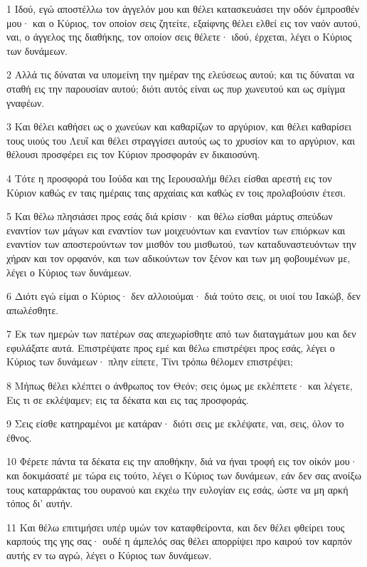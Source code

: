 \par 1 Ιδού, εγώ αποστέλλω τον άγγελόν μου και θέλει κατασκευάσει την οδόν έμπροσθέν μου· και ο Κύριος, τον οποίον σεις ζητείτε, εξαίφνης θέλει ελθεί εις τον ναόν αυτού, ναι, ο άγγελος της διαθήκης, τον οποίον σεις θέλετε· ιδού, έρχεται, λέγει ο Κύριος των δυνάμεων.
\par 2 Αλλά τις δύναται να υπομείνη την ημέραν της ελεύσεως αυτού; και τις δύναται να σταθή εις την παρουσίαν αυτού; διότι αυτός είναι ως πυρ χωνευτού και ως σμίγμα γναφέων.
\par 3 Και θέλει καθήσει ως ο χωνεύων και καθαρίζων το αργύριον, και θέλει καθαρίσει τους υιούς του Λευΐ και θέλει στραγγίσει αυτούς ως το χρυσίον και το αργύριον, και θέλουσι προσφέρει εις τον Κύριον προσφοράν εν δικαιοσύνη.
\par 4 Τότε η προσφορά του Ιούδα και της Ιερουσαλήμ θέλει είσθαι αρεστή εις τον Κύριον καθώς εν ταις ημέραις ταις αρχαίαις και καθώς εν τοις προλαβούσιν έτεσι.
\par 5 Και θέλω πλησιάσει προς εσάς διά κρίσιν· και θέλω είσθαι μάρτυς σπεύδων εναντίον των μάγων και εναντίον των μοιχευόντων και εναντίον των επιόρκων και εναντίον των αποστερούντων τον μισθόν του μισθωτού, των καταδυναστευόντων την χήραν και τον ορφανόν, και των αδικούντων τον ξένον και των μη φοβουμένων με, λέγει ο Κύριος των δυνάμεων.
\par 6 Διότι εγώ είμαι ο Κύριος· δεν αλλοιούμαι· διά τούτο σεις, οι υιοί του Ιακώβ, δεν απωλέσθητε.
\par 7 Εκ των ημερών των πατέρων σας απεχωρίσθητε από των διαταγμάτων μου και δεν εφυλάξατε αυτά. Επιστρέψατε προς εμέ και θέλω επιστρέψει προς εσάς, λέγει ο Κύριος των δυνάμεων· πλην είπετε, Τίνι τρόπω θέλομεν επιστρέψει;
\par 8 Μήπως θέλει κλέπτει ο άνθρωπος τον Θεόν; σεις όμως με εκλέπτετε· και λέγετε, Εις τι σε εκλέψαμεν; εις τα δέκατα και εις τας προσφοράς.
\par 9 Σεις είσθε κατηραμένοι με κατάραν· διότι σεις με εκλέψατε, ναι, σεις, όλον το έθνος.
\par 10 Φέρετε πάντα τα δέκατα εις την αποθήκην, διά να ήναι τροφή εις τον οίκόν μου· και δοκιμάσατέ με τώρα εις τούτο, λέγει ο Κύριος των δυνάμεων, εάν δεν σας ανοίξω τους καταρράκτας του ουρανού και εκχέω την ευλογίαν εις εσάς, ώστε να μη αρκή τόπος δι' αυτήν.
\par 11 Και θέλω επιτιμήσει υπέρ υμών τον καταφθείροντα, και δεν θέλει φθείρει τους καρπούς της γης σας· ουδέ η άμπελός σας θέλει απορρίψει προ καιρού τον καρπόν αυτής εν τω αγρώ, λέγει ο Κύριος των δυνάμεων.
